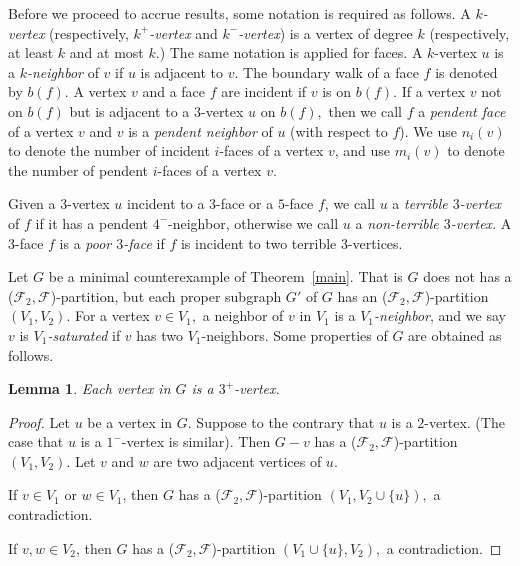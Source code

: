 \documentclass[11pt]{amsart} %
\newtheorem{lemma}[theorem]{Lemma}
\theoremstyle{definition}
\begin{document}
Before we proceed to accrue results, 
some notation is required as follows. 
A \emph{$k$-vertex} (respectively, \emph{$k^+$-vertex} 
and  \emph{$k^-$-vertex})  is a vertex of degree $k$ 
(respectively, at least $k$ and at most $k.$) 
The same notation is applied for faces. 
A $k$-vertex $u$ is a \emph{$k$-neighbor} of $v$ if 
$u$ is adjacent to $v.$ 
The boundary walk of a face $f$ is denoted by $b(f).$ 
A vertex $v$ and a face $f$ are incident if $v$ is on $b(f).$ 
If a vertex $v$ not on $b(f)$ but is adjacent to a $3$-vertex 
$u$ on $b(f),$  then we call $f$ a \emph{pendent face} 
of a vertex $v$ and  $v$ is a \emph{pendent neighbor} 
of $u$ (with respect to $f$).   
We use $n_i(v)$ to denote the number of incident $i$-faces 
of a vertex $v$, 
and use $m_i(v)$ to denote the number 
of pendent  $i$-faces of a vertex $v$.

Given a $3$-vertex $u$ incident to a $3$-face or a $5$-face $f$, 
we call $u$ a \emph{terrible $3$-vertex} of $f$ if it has a 
pendent $4^-$-neighbor, otherwise we call $u$ 
a \emph{non-terrible $3$-vertex}. 
A $3$-face $f$ is a \emph{poor $3$-face} 
if $f$ is incident to two terrible $3$-vertices. 

Let $G$ be a minimal counterexample of Theorem~\ref{main}. 
That is $G$ does not has a ($\mathcal{F}_2,\mathcal{F}$)-partition, 
but each proper subgraph $G'$ of $G$ has 
an ($\mathcal{F}_2,\mathcal{F}$)-partition $(V_1,V_2).$  
For a vertex $v\in V_1,$  
a neighbor of $v$ in $V_1$ is a \emph{$V_1$-neighbor}, 
and we say $v$ is \emph{$V_1$-saturated} 
if $v$ has two $V_1$-neighbors. 
Some properties of $G$ are obtained as follows.

\begin{lemma}\label{atleast3} Each vertex in $G$ is a $3^+$-vertex.
\end{lemma}
\begin{proof} Let $u$ be a vertex in $G$. 
Suppose to the contrary that $u$ is a $2$-vertex. 
(The case that $u$ is a $1^-$-vertex is similar). 
Then $G-v$ has a ($\mathcal{F}_2,\mathcal{F}$)-partition $(V_1,V_2)$.  
Let $v$ and $w$ are two adjacent vertices of $u.$ 
	
If $v\in V_1$ or $w\in V_1$, 
then $G$ has a ($\mathcal{F}_2,\mathcal{F}$)-partition 
$(V_1,V_2\cup \{u\}),$ a contradiction. 
	
If $v, w\in V_2$, then $G$ has a ($\mathcal{F}_2,\mathcal{F}$)-partition $(V_1\cup \{u\},V_2),$ a contradiction.
\end{proof}
\end{document}
